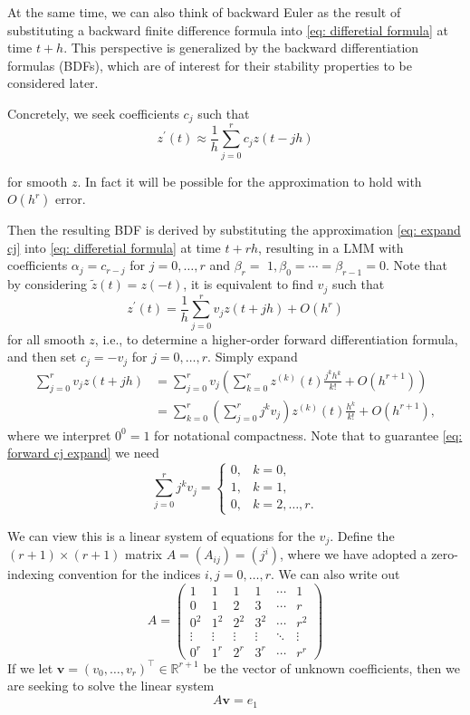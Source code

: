 At the same time, we can also think of backward Euler as the result of substituting a backward finite difference formula into \eqref{eq: differetial formula} at time $t+h$. This perspective is generalized by the backward differentiation formulas (BDFs), which are of interest for their stability properties to be considered later.

Concretely, we seek coefficients $c_j$ such that
\begin{equation}
\label{eq: expand cj}
z^{\prime}(t) \approx \frac{1}{h} \sum_{j=0}^r c_j z(t-j h)
\end{equation}

for smooth $z$. In fact it will be possible for the approximation  to hold with $O\left(h^r\right)$ error.

Then the resulting BDF is derived by substituting the approximation \eqref{eq: expand cj} into \eqref{eq: differetial formula} at time $t+r h$, resulting in a LMM with coefficients $\alpha_j=c_{r-j}$ for $j=0, \ldots, r$ and $\beta_r=$ $1, \beta_0=\cdots=\beta_{r-1}=0$.
Note that by considering $\tilde{z}(t)=z(-t)$, it is equivalent to find $v_j$ such that
\begin{equation}
\label{eq: forward cj expand}
    z^{\prime}(t)=\frac{1}{h} \sum_{j=0}^r v_j z(t+j h)+O\left(h^r\right)
\end{equation}
for all smooth $z$, i.e., to determine a higher-order forward differentiation formula, and then set $c_j=-v_j$ for $j=0, \ldots, r$.
Simply expand 
$$
\begin{aligned}
\sum_{j=0}^r v_j z(t+j h) & =\sum_{j=0}^r v_j\left(\sum_{k=0}^r z^{(k)}(t) \frac{j^k h^k}{k !}+O\left(h^{r+1}\right)\right) \\
& =\sum_{k=0}^r\left(\sum_{j=0}^r j^k v_j\right) z^{(k)}(t) \frac{h^k}{k !}+O\left(h^{r+1}\right),
\end{aligned}
$$
where we interpret $0^0=1$ for notational compactness. Note that to guarantee \eqref{eq: forward cj expand} we need
$$
\sum_{j=0}^r j^k v_j= \begin{cases}0, & k=0, \\ 1, & k=1, \\ 0, & k=2, \ldots, r .\end{cases}
$$

We can view this is a linear system of equations for the $v_j$. Define the $(r+1) \times(r+1)$ matrix $A=\left(A_{i j}\right)=\left(j^i\right)$, where we have adopted a zero-indexing convention for the indices $i, j=0, \ldots, r$. We can also write out
$$
A=\left(\begin{array}{cccccc}
1 & 1 & 1 & 1 & \cdots & 1 \\
0 & 1 & 2 & 3 & \cdots & r \\
0^2 & 1^2 & 2^2 & 3^2 & \cdots & r^2 \\
\vdots & \vdots & \vdots & \vdots & \ddots & \vdots \\
0^r & 1^r & 2^r & 3^r & \cdots & r^r
\end{array}\right)
$$
If we let $\mathbf{v}=\left(v_0, \ldots, v_r\right)^{\top} \in \mathbb{R}^{r+1}$ be the vector of unknown coefficients, then we are seeking to solve the linear system
$$
A \mathbf{v}=e_1
$$

